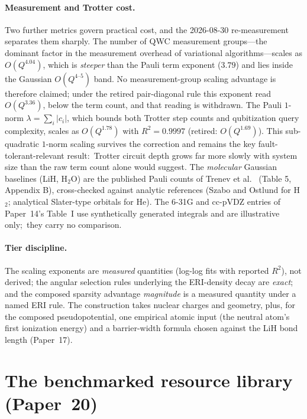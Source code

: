 \documentclass[aps,pra,twocolumn,superscriptaddress,longbibliography]{revtex4-2}
\begin{document}
\paragraph{Measurement and Trotter cost.}
Two further metrics govern practical cost, and the 2026-08-30
re-measurement separates them sharply.  The number of QWC measurement
groups---the dominant factor in the measurement overhead of variational
algorithms---scales as $O(Q^{4.04})$, which is \emph{steeper} than the
Pauli term exponent ($3.79$) and lies inside the Gaussian
$O(Q^{4\text{--}5})$ band.  No measurement-group scaling advantage is
therefore claimed; under the retired pair-diagonal rule this exponent read
$O(Q^{3.36})$, below the term count, and that reading is withdrawn.  The
Pauli $1$-norm $\lambda = \sum_i |c_i|$, which bounds both Trotter step
counts and qubitization query complexity, scales as $O(Q^{1.78})$ with
$R^2 = 0.9997$ (retired: $O(Q^{1.69})$).  This sub-quadratic $1$-norm
scaling survives the correction and remains the key
fault-tolerant-relevant result:\ Trotter circuit depth grows far more
slowly with system size than the raw term count alone would suggest.
The \emph{molecular} Gaussian baselines (LiH, H$_2$O) are the published
Pauli counts of Trenev et al.~\cite{trenev2025} (Table 5, Appendix B),
cross-checked against analytic references (Szabo and Ostlund for H$_2$;
analytical Slater-type orbitals for He).  The 6-31G and cc-pVDZ entries of
Paper~14's Table~I use synthetically generated integrals and are
illustrative only;\ they carry no comparison.

\paragraph{Tier discipline.}
The scaling exponents are \emph{measured} quantities (log-log fits with
reported $R^2$), not derived; the angular selection rules underlying the
ERI-density decay are \emph{exact}; and the composed sparsity advantage
\emph{magnitude} is a measured quantity under a named ERI rule.  The
construction takes nuclear charges and geometry, plus, for the composed
pseudopotential, one empirical atomic input (the neutral atom's first
ionization energy) and a barrier-width formula chosen against the LiH
bond length (Paper~17).

\section{The benchmarked resource library (Paper~20)}
\end{document}
